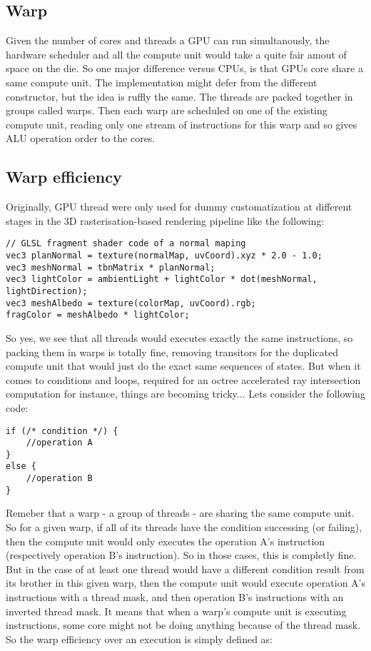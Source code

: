 \subsection{Warp}
\label{subsec:warp}
Given the number of cores and threads a GPU can run simultanously, the hardware
scheduler and all the compute unit would take a quite fair amout of space on the
die. So one major difference versus CPUs, is that GPUs core share a same
compute unit. The implementation might defer from the different constructor, but
the idea is ruffly the same. The threads are packed together in groups called
warps. Then each warp are scheduled on one of the existing compute unit, reading
only one stream of instructions for this warp and so gives ALU operation order
to the cores.

\subsection{Warp efficiency}
Originally, GPU thread were only used for dummy customatization at different
stages in the 3D rasterisation-based rendering pipeline like the following:
\begin{lstlisting}[morekeywords={vec3,texture}]
// GLSL fragment shader code of a normal maping
vec3 planNormal = texture(normalMap, uvCoord).xyz * 2.0 - 1.0;
vec3 meshNormal = tbnMatrix * planNormal;
vec3 lightColor = ambientLight + lightColor * dot(meshNormal, lightDirection);
vec3 meshAlbedo = texture(colorMap, uvCoord).rgb;
fragColor = meshAlbedo * lightColor;
\end{lstlisting}
So yes, we see that all threads would executes exactly the same instructions, so
packing them in warps is totally fine, removing transitors for the duplicated
compute unit that would just do the exact same sequences of states. But when
it comes to conditions and loops, required for an octree accelerated ray
intersection computation for instance, things are becoming tricky... Lets
consider the following code:
\begin{lstlisting}
if (/* condition */) {
    //operation A
}
else {
    //operation B
}
\end{lstlisting}
Remeber that a warp - a group of threads - are sharing the same compute unit. So
for a given warp, if all of its threads have the condition successing (or failing),
then the compute unit would only executes the operation A's instruction (respectively
operation B's instruction). So in those cases, this is completly fine. But in the
case of at least one thread would have a different condition result from its
brother in this given warp, then the compute unit would execute operation A's
instructions with a thread mask, and then operation B's instructions
with an inverted thread mask. It means that when a warp's compute unit is
executing instructions, some core might not be doing anything because of the
thread mask. So the warp efficiency over an execution is simply defined as:


